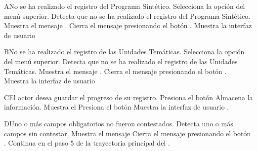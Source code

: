 \begin{UCtrayectoriaA}{A}{No se ha realizado el registro del Programa Sintético.}
    \UCpaso[\UCactor] Selecciona la opción  del menú superior.
    \UCpaso Detecta que no se ha realizado el registro del Programa Sintético.
        \UCpaso Muestra el mensaje .
    \UCpaso[\UCactor] Cierra el mensaje presionando el botón .
    \UCpaso Muestra la interfaz de usuario 
\end{UCtrayectoriaA}


\begin{UCtrayectoriaA}{B}{No se ha realizado el registro de las Unidades Temáticas.}
    \UCpaso[\UCactor] Selecciona la opción  del menú superior.
    \UCpaso Detecta que no se ha realizado el registro de las Unidades Temáticas.
        \UCpaso Muestra el mensaje .
    \UCpaso[\UCactor] Cierra el mensaje presionando el botón .
    \UCpaso Muestra la interfaz de usuario 
\end{UCtrayectoriaA}


\begin{UCtrayectoriaA}{C}{El actor desea guardar el progreso de su registro.}
\UCpaso[\UCactor] Presiona el botón 
\UCpaso Almacena la información.
\UCpaso Muestra el 
\UCpaso[\UCactor] Presiona el botón  
\UCpaso Muestra la interfaz de usuario .
\end{UCtrayectoriaA}


\begin{UCtrayectoriaA}{D}{Uno o más campos obligatorios no fueron contestados.}
	\UCpaso Detecta uno o más campos sin contestar.
    \UCpaso Muestra el mensaje 
    \UCpaso[\UCactor] Cierra el mensaje presionando el botón .
    \UCpaso Continua en el paso 5 de la trayectoria principal del .
\end{UCtrayectoriaA}


